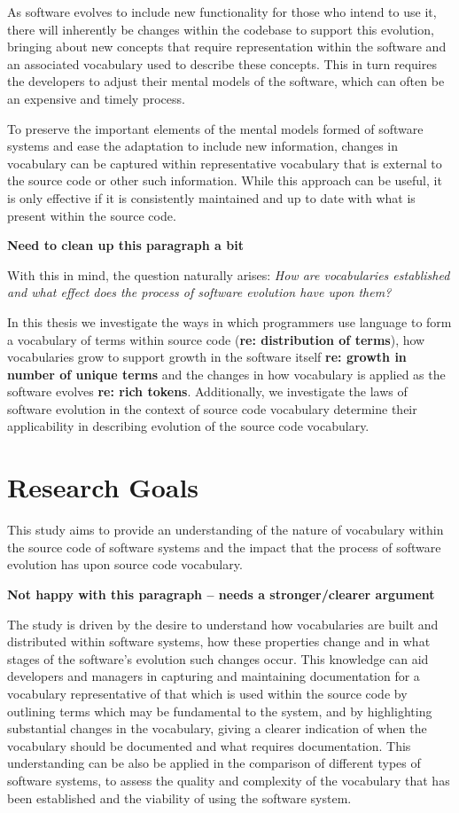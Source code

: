 As software evolves to include new functionality for those who intend to use it, there will inherently be changes within the codebase to support this evolution, bringing about new concepts that require representation within the software and an associated vocabulary used to describe these concepts. This in turn requires the developers to adjust their mental models of the software, which can often be an expensive and timely process.

To preserve the important elements of the mental models formed of software systems and ease the adaptation to include new information, changes in vocabulary can be captured within representative vocabulary that is external to the source code or other such information. While this approach can be useful, it is only effective if it is consistently maintained and up to date with what is present within the source code.

\textbf{Need to clean up this paragraph a bit}

With this in mind, the question naturally arises: \emph{How are vocabularies established and what effect does the process of software evolution have upon them?}

In this thesis we investigate the ways in which programmers use language to form a vocabulary of terms within source code (\textbf{re: distribution of terms}), how vocabularies grow to support growth in the software itself \textbf{re: growth in number of unique terms} and the changes in how vocabulary is applied as the software evolves \textbf{re: rich tokens}. Additionally, we investigate the laws of software evolution in the context of source code vocabulary determine their applicability in describing evolution of the source code vocabulary.

\section{Research Goals} %
\label{sec:research_goals}

This study aims to provide an understanding of the nature of vocabulary within the source code of software systems and the impact that the process of software evolution has upon source code vocabulary.

\textbf{Not happy with this paragraph -- needs a stronger/clearer argument}

The study is driven by the desire to understand how vocabularies are built and distributed within software systems, how these properties change and in what stages of the software's evolution such changes occur. This knowledge can aid developers and managers in capturing and maintaining documentation for a vocabulary representative of that which is used within the source code by outlining terms which may be fundamental to the system, and by highlighting substantial changes in the vocabulary, giving a clearer indication of when the vocabulary should be documented and what requires documentation. This understanding can be also be applied in the comparison of different types of software systems, to assess the quality and complexity of the vocabulary that has been established and the viability of using the software system.

